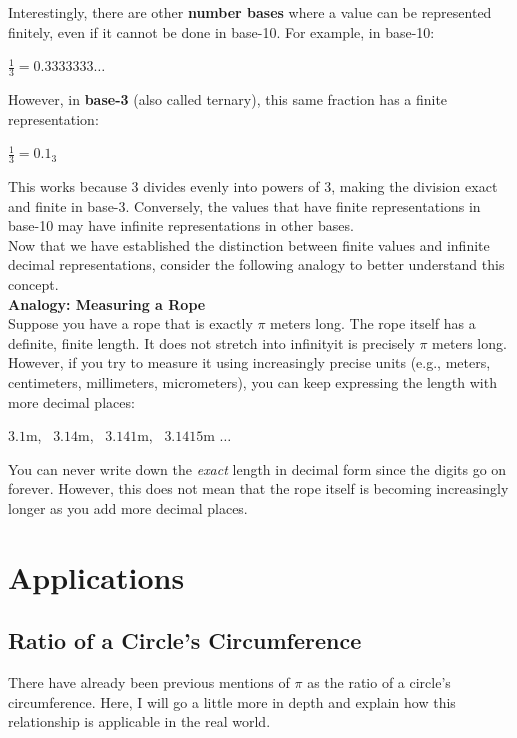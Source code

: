 \documentclass[12pt]{article}
\begin{document}
\noindent Interestingly, there are other \textbf{number bases} where a value can be represented finitely, even if it cannot be done in base-10. For example, in base-10:
\begin{center}
    $\frac{1}{3} = 0.3333333 \ldots$
\end{center}

\noindent However, in \textbf{base-3} (also called ternary), this same fraction has a finite representation:
\begin{center}
    $\frac{1}{3} = 0.1_3$
\end{center}

\noindent This works because 3 divides evenly into powers of 3, making the division exact and finite in base-3. Conversely, the values that have finite representations in base-10 may have infinite representations in other bases.\\

\noindent Now that we have established the distinction between finite values and infinite decimal representations, consider the following analogy to better understand this concept.\\

\noindent \textbf{Analogy: Measuring a Rope}\\

\noindent Suppose you have a rope that is exactly $\pi$ meters long. The rope itself has a definite, finite length. It does not stretch into infinity\textendash it is precisely $\pi$ meters long. However, if you try to measure it using increasingly precise units (e.g., meters, centimeters, millimeters, micrometers), you can keep expressing the length with more decimal places:
\begin{center}
    $3.1$m, \ $3.14$m, \ $3.141$m, \ $3.1415$m $\ldots$
\end{center}
You can never write down the \textit{exact} length in decimal form since the digits go on forever. However, this does not mean that the rope itself is becoming increasingly longer as you add more decimal places. 

\section{Applications}

\subsection{Ratio of a Circle's Circumference}
There have already been previous mentions of $\pi$ as the ratio of a circle's circumference. Here, I will go a little more in depth and explain how this relationship is applicable in the real world.\\
\end{document}
